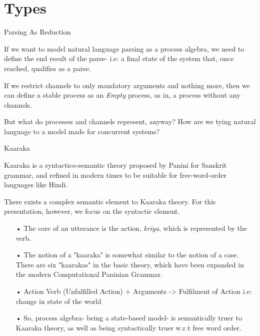 \documentclass{article}
\begin{document}
\section{Types}

\begin{frame}{Parsing As Reduction}

If we want to model natural language parsing as a process algebra, we need to define the end result of the parse- i.e: a final state of the system that, once reached, qualifies as a parse.

If we restrict channels to only mandatory arguments and nothing more, then we can define a stable process as an \textit{Empty} process, as in, a process without any channels.

But what do processes and channels represent, anyway? How are we tying natural language to a model made for concurrent systems?

\end{frame}

\begin{frame}{Kaaraka}

Kaaraka is a syntactico-semantic theory proposed by Panini for Sanskrit grammar, and refined in modern times to be suitable for free-word-order languages like Hindi.

There exists a complex semantic element to Kaaraka theory. For this presentation, however, we focus on the syntactic element.

\begin{itemize}
\item[•]
The core of an utterance is the action, \textit{kriya}, which is represented by the verb.
\item[•]
The notion of a "kaaraka" is somewhat similar to the notion of a case. There are six "kaarakas" in the basic theory, which have been expanded in the modern Computational Paninian Grammar.
\item[•]
Action Verb (Unfulfilled Action) + Arguments -> Fulfilment of Action i.e: change in state of the world
\item[•]
So, process algebra- being a state-based model- is semantically truer to Kaaraka theory, as well as being syntactically truer w.r.t free word order.
\end{itemize}

\end{frame}
\end{document}
